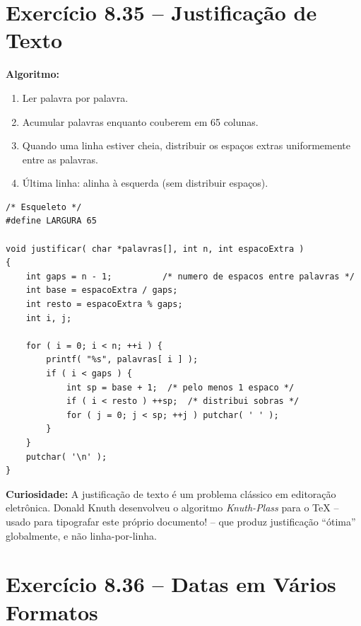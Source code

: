 \documentclass[12pt,a4paper]{article}
\begin{document}
\newpage

\section{Exercício 8.35 -- Justificação de Texto}

\begin{respostabox}
\textbf{Algoritmo:}
\begin{enumerate}[noitemsep]
  \item Ler palavra por palavra.
  \item Acumular palavras enquanto couberem em 65 colunas.
  \item Quando uma linha estiver cheia, distribuir os espaços extras
  uniformemente entre as palavras.
  \item Última linha: alinha à esquerda (sem distribuir espaços).
\end{enumerate}

\begin{lstlisting}
/* Esqueleto */
#define LARGURA 65

void justificar( char *palavras[], int n, int espacoExtra )
{
    int gaps = n - 1;          /* numero de espacos entre palavras */
    int base = espacoExtra / gaps;
    int resto = espacoExtra % gaps;
    int i, j;

    for ( i = 0; i < n; ++i ) {
        printf( "%s", palavras[ i ] );
        if ( i < gaps ) {
            int sp = base + 1;  /* pelo menos 1 espaco */
            if ( i < resto ) ++sp;  /* distribui sobras */
            for ( j = 0; j < sp; ++j ) putchar( ' ' );
        }
    }
    putchar( '\n' );
}
\end{lstlisting}

\textbf{Curiosidade:} A justificação de texto é um problema clássico em editoração
eletrônica. Donald Knuth desenvolveu o algoritmo \textit{Knuth-Plass} para o
\TeX{} -- usado para tipografar este próprio documento! -- que produz justificação
``ótima'' globalmente, e não linha-por-linha.
\end{respostabox}

\section{Exercício 8.36 -- Datas em Vários Formatos}
\end{document}

